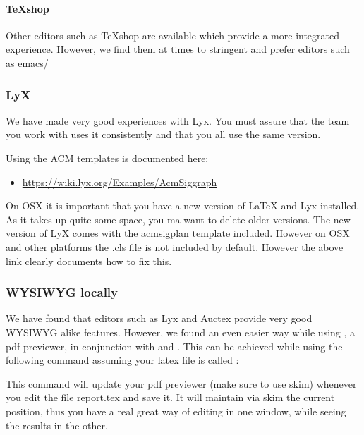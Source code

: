 \paragraph{TeXshop}
\label{\detokenize{lesson/doc/latex:texshop}}
Other editors such as TeXshop are available which provide a more
integrated experience. However, we find them at times to stringent and
prefer editors such as emacs/


\subsubsection{LyX}
\label{\detokenize{lesson/doc/latex:lyx}}
We have made very good experiences with Lyx. You must assure that the
team you work with uses it consistently and that you all use the same version.

Using the ACM templates is documented here:
\begin{itemize}
\item {} 
\url{https://wiki.lyx.org/Examples/AcmSiggraph}

\end{itemize}

On OSX it is important that you have a new version of LaTeX and Lyx
installed. As it takes up quite some space, you ma want to delete
older versions. The new version of LyX comes with the acmsigplan
template included. However on OSX and other platforms the .cls file is
not included by default. However the above link clearly documents how
to fix this.


\subsubsection{WYSIWYG locally}
\label{\detokenize{lesson/doc/latex:wysiwyg-locally}}
We have found that editors such as Lyx and Auctex provide very good
WYSIWYG alike features. However, we found an even easier way while
using , a pdf previewer, in conjunction with  and
. This can be achieved while using the following command
assuming your latex file is called :

\begin{sphinxVerbatim}[commandchars=\\\{\}]
   
\end{sphinxVerbatim}

This command will update your pdf previewer (make sure to use skim)
whenever you edit the file report.tex and save it. It will maintain
via skim the current position, thus you have a real great way of
editing in one window, while seeing the results in the other.

